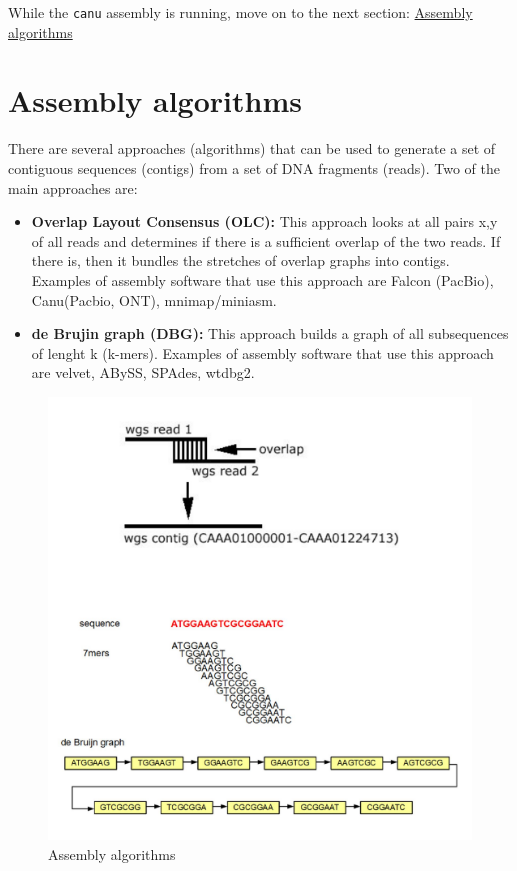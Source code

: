 \documentclass[11pt]{article}
\begin{document}
    While the \texttt{canu} assembly is running, move on to the next
section: \href{assembly_algorithms.ipynb}{Assembly algorithms}





\newpage





    \hypertarget{assembly-algorithms}{%
\section{Assembly algorithms}\label{assembly-algorithms}}

There are several approaches (algorithms) that can be used to generate a
set of contiguous sequences (contigs) from a set of DNA fragments
(reads). Two of the main approaches are:

\begin{itemize}
\item
  \textbf{Overlap Layout Consensus (OLC):} This approach looks at all
  pairs x,y of all reads and determines if there is a sufficient overlap
  of the two reads. If there is, then it bundles the stretches of
  overlap graphs into contigs. Examples of assembly software that use
  this approach are Falcon (PacBio), Canu(Pacbio, ONT), mnimap/miniasm.
\item
  \textbf{de Brujin graph (DBG):} This approach builds a graph of all
  subsequences of lenght k (k-mers). Examples of assembly software that
  use this approach are velvet, ABySS, SPAdes, wtdbg2.
\end{itemize}

    \begin{figure}
\centering
\includegraphics{images/assembly_algorithms.png}
\caption{Assembly algorithms}
\end{figure}
\end{document}
